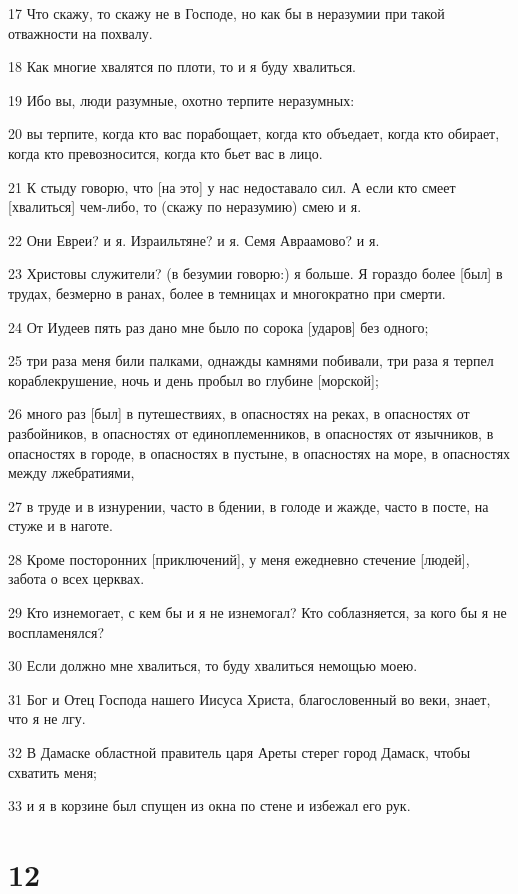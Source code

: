 \par 17 Что скажу, то скажу не в Господе, но как бы в неразумии при такой отважности на похвалу.
\par 18 Как многие хвалятся по плоти, то и я буду хвалиться.
\par 19 Ибо вы, люди разумные, охотно терпите неразумных:
\par 20 вы терпите, когда кто вас порабощает, когда кто объедает, когда кто обирает, когда кто превозносится, когда кто бьет вас в лицо.
\par 21 К стыду говорю, что [на это] у нас недоставало сил. А если кто смеет [хвалиться] чем-либо, то (скажу по неразумию) смею и я.
\par 22 Они Евреи? и я. Израильтяне? и я. Семя Авраамово? и я.
\par 23 Христовы служители? (в безумии говорю:) я больше. Я гораздо более [был] в трудах, безмерно в ранах, более в темницах и многократно при смерти.
\par 24 От Иудеев пять раз дано мне было по сорока [ударов] без одного;
\par 25 три раза меня били палками, однажды камнями побивали, три раза я терпел кораблекрушение, ночь и день пробыл во глубине [морской];
\par 26 много раз [был] в путешествиях, в опасностях на реках, в опасностях от разбойников, в опасностях от единоплеменников, в опасностях от язычников, в опасностях в городе, в опасностях в пустыне, в опасностях на море, в опасностях между лжебратиями,
\par 27 в труде и в изнурении, часто в бдении, в голоде и жажде, часто в посте, на стуже и в наготе.
\par 28 Кроме посторонних [приключений], у меня ежедневно стечение [людей], забота о всех церквах.
\par 29 Кто изнемогает, с кем бы и я не изнемогал? Кто соблазняется, за кого бы я не воспламенялся?
\par 30 Если должно мне хвалиться, то буду хвалиться немощью моею.
\par 31 Бог и Отец Господа нашего Иисуса Христа, благословенный во веки, знает, что я не лгу.
\par 32 В Дамаске областной правитель царя Ареты стерег город Дамаск, чтобы схватить меня;
\par 33 и я в корзине был спущен из окна по стене и избежал его рук.

\chapter{12}

